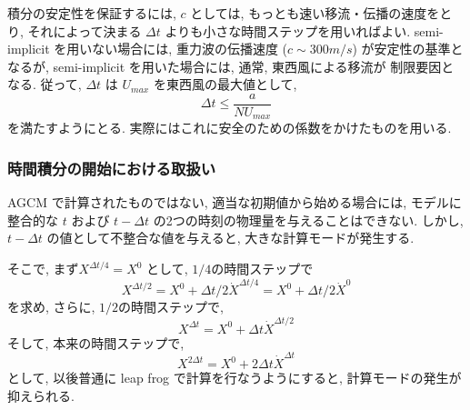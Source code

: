 積分の安定性を保証するには,
$c$ としては, もっとも速い移流・伝播の速度をとり,
それによって決まる $\Delta t$ よりも小さな時間ステップを用いればよい.
semi-implicit を用いない場合には, 重力波の伝播速度
($c \sim 300m/s$) が安定性の基準となるが,
semi-implicit を用いた場合には, 通常, 東西風による移流が
制限要因となる.
従って, $\Delta t$ は $U_{max}$ を東西風の最大値として,
\begin{equation}
   \Delta t \le \frac{a}{N U_{max}}  
\end{equation}
を満たすようにとる.
実際にはこれに安全のための係数をかけたものを用いる.

\subsubsection{時間積分の開始における取扱い}

AGCM で計算されたものではない, 
適当な初期値から始める場合には, モデルに整合的な
$t$ および $t-\Delta t$ の2つの時刻の物理量を与えることはできない.
しかし, $t-\Delta t$ の値として不整合な値を与えると,
大きな計算モードが発生する.

そこで, まず$X^{\Delta t/4} = X^0$ として, $1/4$の時間ステップで
\begin{displaymath}
  X^{\Delta t/2} = X^0 + \Delta t/2 \dot{X}^{\Delta t/4}
                 = X^0 + \Delta t/2 \dot{X}^0
\end{displaymath}
を求め, さらに, $1/2$の時間ステップで,
\begin{displaymath}
  X^{\Delta t}   = X^0 + \Delta t \dot{X}^{\Delta t/2}
\end{displaymath}
そして, 本来の時間ステップで,
\begin{displaymath}
  X^{2\Delta t}   = X^0 + 2 \Delta t \dot{X}^{\Delta t}
\end{displaymath}
として, 以後普通に leap frog で計算を行なうようにすると,
計算モードの発生が抑えられる.
